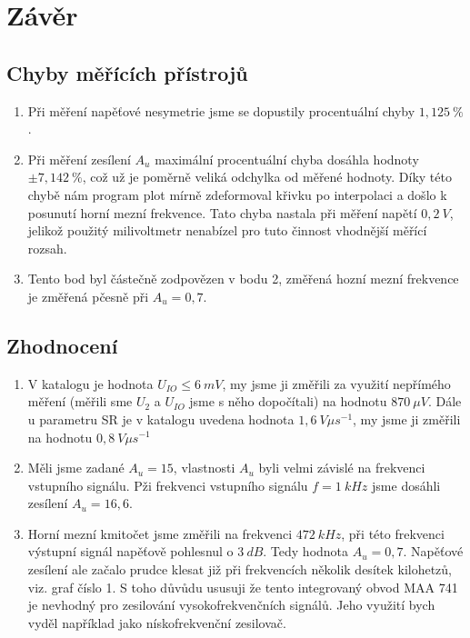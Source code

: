 \section*{Závěr}
  
  
  \subsection*{Chyby měřících přístrojů}
    \begin{enumerate}
    	\item
    		Při měření napěťové nesymetrie jsme se dopustily procentuální chyby $1,125~\%$.
    	\item
    		Při měření zesílení $A_u$ maximální procentuální chyba dosáhla hodnoty $\pm 7,142~\%$, což už je poměrně veliká odchylka od měřené hodnoty. Díky této chybě nám program plot mírně zdeformoval křivku po interpolaci a došlo k posunutí horní mezní frekvence. Tato chyba nastala při měření napětí $0,2~V$, jelikož použitý milivoltmetr nenabízel pro tuto činnost vhodnější měřící rozsah.
    	\item
    		Tento bod byl částečně zodpovězen v bodu 2, změřená hozní mezní frekvence je změřená pčesně při $A_u = 0,7$.
    \end{enumerate}
  
  
  \subsection*{Zhodnocení}
    \begin{enumerate}
      \item
        V katalogu je hodnota $U_{IO} \leq 6~mV$, my jsme ji změřili za využití nepřímého měření (měřili sme $U_2$ a $U_{IO}$ jsme s něho dopočítali) na hodnotu $870~\mu V$. Dále u parametru SR je v katalogu uvedena hodnota $1,6~V\mu s^{-1}$, my jsme ji změřili na hodnotu $0,8~V\mu s^{-1}$
      \item
        Měli jsme zadané $A_u = 15$, vlastnosti $A_u$ byli velmi závislé na frekvenci vstupního signálu. Pži frekvenci vstupního signálu $f = 1~kHz$ jsme dosáhli zesílení $A_u = 16,6$.
      \item
      	Horní mezní kmitočet jsme změřili na frekvenci $472~kHz$, při této frekvenci výstupní signál napěťově pohlesnul o $3~dB$. Tedy hodnota $A_u = 0,7$. Napěťové zesílení ale začalo prudce klesat již při frekvencích několik desítek kilohetzů, viz. graf číslo 1. S toho důvůdu ususuji že tento integrovaný obvod MAA 741 je nevhodný pro zesilování vysokofrekvenčních signálů. Jeho využití bych vyděl například jako nískofrekvenční zesilovač.
    \end{enumerate}
